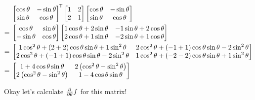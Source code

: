 \documentclass[11pt, oneside]{amsart}
\begin{document}
\begin{equation*}
  \begin{split}
      &\begin{bmatrix}
        \cos\theta & -\sin\theta \\
        \sin\theta & \cos\theta
      \end{bmatrix}^{\mkern-1.5mu\mathsf{T}}
      \begin{bmatrix}
        1 & 2 \\
        2 & 1
      \end{bmatrix}
      \begin{bmatrix}
        \cos\theta & -\sin\theta \\
        \sin\theta & \cos\theta
      \end{bmatrix}
    \\
    ={}&
      \begin{bmatrix}
        \cos\theta  & \sin\theta \\
        -\sin\theta & \cos\theta
      \end{bmatrix}
      \begin{bmatrix}
        1\cos\theta + 2\sin\theta & -1\sin\theta + 2\cos\theta \\
        2\cos\theta + 1\sin\theta & -2\sin\theta + 1\cos\theta
      \end{bmatrix}
    \\
    ={}&
      \begin{bmatrix}
        1 \cos^2\theta + (2 + 2) \cos\theta \sin\theta + 1 \sin^2\theta
        &
        2 \cos^2\theta + (-1 + 1) \cos\theta \sin\theta - 2\sin^2\theta
        \\
        2 \cos^2\theta + (-1 + 1) \cos\theta \sin\theta - 2\sin^2\theta
        &
        1\cos^2\theta + (-2 - 2) \cos\theta\sin\theta + 1\sin^2\theta
      \end{bmatrix}
    \\
    ={}&
      \begin{bmatrix}
        1 + 4\cos\theta\sin\theta
        &
        2 \left( \cos^2\theta - \sin^2\theta \right)
        \\
        2 \left( \cos^2\theta - \sin^2\theta \right)
        &
        1 - 4\cos\theta\sin\theta
      \end{bmatrix}
    \end{split}
\end{equation*}

Okay let's calculate $\frac{\partial }{\partial \theta} f$ for this matrix!
\end{document}
